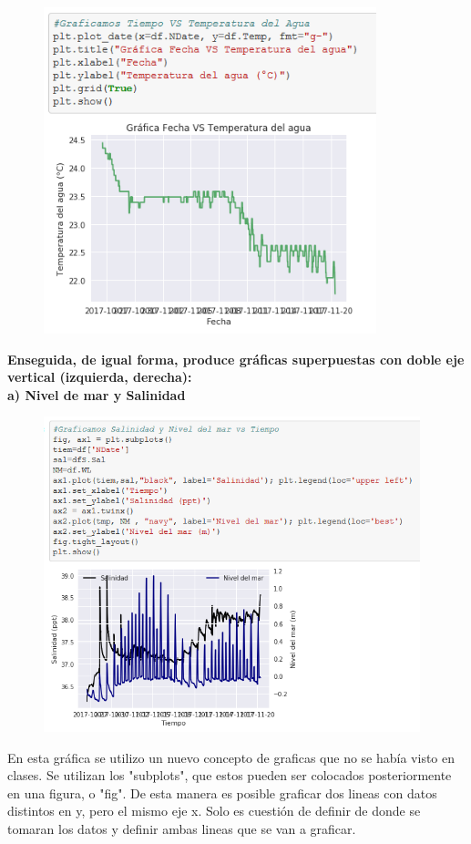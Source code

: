 \documentclass[12pt]{article}
\begin{document}
\begin{figure}[h!]
    \centering
\includegraphics[width=3.8in]{GrafF3.png}
\end{figure}

\noindent\textbf {Enseguida, de igual forma, produce gráficas superpuestas con doble eje vertical (izquierda, derecha):} \\

\noindent\textbf {a) Nivel de mar y Salinidad}
\begin{figure}[h!]
    \centering
\includegraphics[width=4.3in]{SP1.png}
\end{figure}

En esta gráfica se utilizo un nuevo concepto de graficas que no se había visto en clases. Se utilizan los "subplots", que estos pueden ser colocados posteriormente en una figura, o "fig". De esta manera es posible graficar dos lineas con datos distintos en y, pero el mismo eje x. Solo es cuestión de definir de donde se tomaran los datos y definir ambas lineas que se van a graficar. \\
\end{document}
